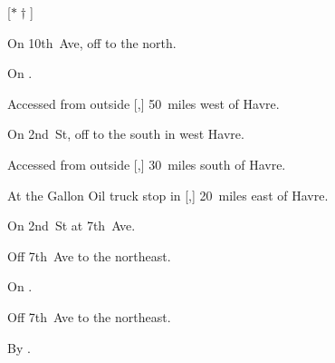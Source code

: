 
[$\ast\dagger$]

\begin{LocationList}

On 10th~Ave, off  to the north.

On .

Accessed from  outside [,] 50~miles west of Havre.

On 2nd~St, off  to the south in west Havre.

Accessed from  outside [,] 30~miles south of Havre.

At the Gallon Oil truck stop in [,] 20~miles east of Havre.

On 2nd~St at  7th~Ave.

Off  7th~Ave to the northeast.

\Location{\RecruitmentAgency \Recruitment}
On .

Off  7th~Ave to the northeast.

By .

\end{LocationList}
